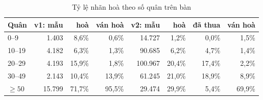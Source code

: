 \begin{table}[H]
  \centering
  \footnotesize
  \caption{Tỷ lệ nhãn hoà theo số quân trên bàn}
  \label{tab:cs-dl-theoquan}
  \begin{tabular}{lrrrrrrr}
    \toprule
    Quân & v1: mẫu & hoà & ván hoà & v2: mẫu & hoà & đã thua & ván hoà \\
    \midrule
    0--9 & 1.403 & 8,6\% & 0,6\% & 14.727 & 1,2\% & 0,0\% & 1,5\% \\
    10--19 & 4.182 & 6,3\% & 1,3\% & 90.685 & 6,2\% & 4,7\% & 1,4\% \\
    20--29 & 4.193 & 15,9\% & 1,8\% & 100.967 & 20,4\% & 17,4\% & 2,2\% \\
    30--49 & 2.143 & 10,4\% & 13,9\% & 61.245 & 21,0\% & 18,9\% & 8,9\% \\
    $\ge 50$ & 15.799 & 71,7\% & 95,5\% & 29.474 & 29,9\% & 5,4\% & 69,9\% \\
    \bottomrule
  \end{tabular}
\end{table}
